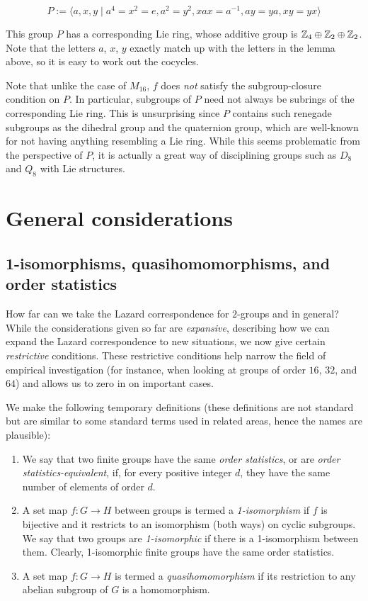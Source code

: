 \documentclass[10pt]{amsart}
\begin{document}
$$P := \langle a,x,y \mid a^4 = x^2 = e, a^2 = y^2, xax = a^{-1}, ay = ya, xy = yx \rangle$$

This group $P$ has a corresponding Lie ring, whose additive group is
$\mathbb{Z}_4 \oplus \mathbb{Z}_2 \oplus \mathbb{Z}_2$. Note that the letters $a$, $x$, $y$
exactly match up with the letters in the lemma above, so it is easy to
work out the cocycles.

Note that unlike the case of $M_{16}$, $f$ does {\em not} satisfy the
subgroup-closure condition on $P$. In particular, subgroups of $P$
need not always be subrings of the corresponding Lie ring. This is
unsurprising since $P$ contains such renegade subgroups as the
dihedral group and the quaternion group, which are well-known for not
having anything resembling a Lie ring. While this seems problematic
from the perspective of $P$, it is actually a great way of
disciplining groups such as $D_8$ and $Q_8$ with Lie structures.

\section{General considerations}

\subsection{1-isomorphisms, quasihomomorphisms, and order statistics}

How far can we take the Lazard correspondence for $2$-groups and in
general? While the considerations given so far are {\em expansive},
describing how we can expand the Lazard correspondence to new
situations, we now give certain {\em restrictive} conditions. These
restrictive conditions help narrow the field of empirical
investigation (for instance, when looking at groups of order $16$,
$32$, and $64$) and allows us to zero in on important cases.

We make the following temporary definitions (these definitions are not
standard but are similar to some standard terms used in related areas,
hence the names are plausible):

\begin{enumerate}
\item We say that two finite groups have the same {\em order
  statistics}, or are {\em order statistics-equivalent}, if, for every
  positive integer $d$, they have the same number of elements of order $d$.
\item A set map $f:G \to H$ between groups is termed a {\em
  1-isomorphism} if $f$ is bijective and it restricts to an
  isomorphism (both ways) on cyclic subgroups. We say that two groups
  are {\em 1-isomorphic} if there is a 1-isomorphism between
  them. Clearly, 1-isomorphic finite groups have the same order statistics.
\item A set map $f:G \to H$ is termed a {\em quasihomomorphism} if its
  restriction to any abelian subgroup of $G$ is a homomorphism.
\end{enumerate}
\end{document}
